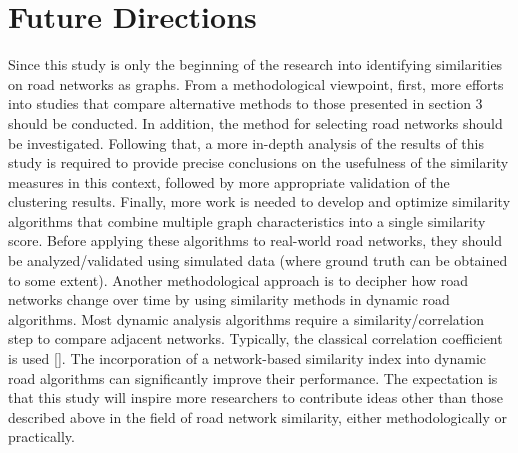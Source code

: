\section{Future Directions}
Since this study is only the beginning of the research into identifying similarities on road networks as graphs. From a methodological viewpoint, first, more efforts into studies that compare alternative methods to those presented in section 3 should be conducted. In addition, the method for selecting road networks should be investigated. Following that, a more in-depth analysis of the results of this study is required to provide precise conclusions on the usefulness of the similarity measures in this context, followed by more appropriate validation of the clustering results. Finally, more work is needed to develop and optimize similarity algorithms that combine multiple graph characteristics into a single similarity score. Before applying these algorithms to real-world road networks, they should be analyzed/validated using simulated data (where ground truth can be obtained to some extent). Another methodological approach is to decipher how road networks change over time by using similarity methods in dynamic road algorithms. Most dynamic analysis algorithms require a similarity/correlation step to compare adjacent networks. Typically, the classical correlation coefficient is used  [\cite{ONeill:2018}]. The incorporation of a network-based similarity index into dynamic road algorithms can significantly improve their performance.
The expectation is that this study will inspire more researchers to contribute ideas other than those described above in the field of road network similarity, either methodologically or practically.